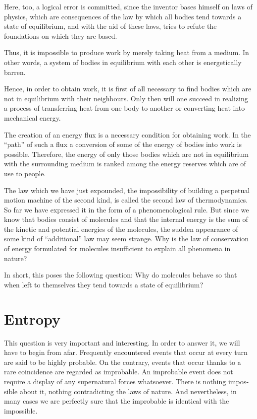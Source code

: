 Here, too, a logical error is committed, since the inventor bases himself on laws of physics, which are consequences of the law by which all bodies tend towards a state of equilibrium, and with the aid of these laws, tries to refute the foundations on which they are based.

Thus, it is impossible to produce work by merely taking heat from a medium. In other words, a system of bodies in equilibrium with each other is energetically barren.

Hence, in order to obtain work, it is first of all neces­sary to find bodies which are not in equilibrium with their neighbours. Only then will one succeed in realizing a process of transferring heat from one body to another or converting heat into mechanical energy.

The creation of an energy flux is a necessary condition for obtaining work. In the ``path'' of such a flux a conver­sion of some of the energy of bodies into work is possible. Therefore, the energy of only those bodies which are not in equilibrium with the surrounding medium is ranked among the energy reserves which are of use to people.

The law which we have just expounded, the impossi­bility of building a perpetual motion machine of the sec­ond kind, is called the second law of thermodynamics. So far we have expressed it in the form of a phenomenological rule. But since we know that bodies consist of mole­cules and that the internal energy is the sum of the kinet­ic and potential energies of the molecules, the sudden appearance of some kind of ``additional'' law may seem strange. Why is the law of conservation of energy formu­lated for molecules insufficient to explain all phenomena in nature?

In short, this poses the following question: Why do molecules behave so that when left to themselves they tend towards a state of equilibrium?

\section{Entropy}
This question is very important and interesting. In order to answer it, we will have to begin from afar. Frequently encountered events that occur at every turn are said to be highly probable. On the contrary, events
that occur thanks to a rare coincidence are regarded as improbable.
An improbable event does not require a display of any supernatural forces whatsoever. There is nothing impos­sible about it, nothing contradicting the laws of nature. And nevertheless, in many cases we are perfectly sure that the improbable is identical with the impossible.

